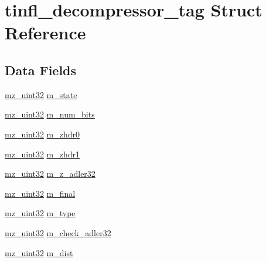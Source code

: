 \hypertarget{structtinfl__decompressor__tag}{}\section{tinfl\+\_\+decompressor\+\_\+tag Struct Reference}
\label{structtinfl__decompressor__tag}
\subsection*{Data Fields}
\begin{DoxyCompactItemize}
\item 
\mbox{\hyperlink{tinfl_8c_ab1a91818a39ac203d5d9f12a003e8557}{mz\+\_\+uint32}} \mbox{\hyperlink{structtinfl__decompressor__tag_a89e483db0cdc8fe1f6663ad068eec049}{m\+\_\+state}}
\item 
\mbox{\hyperlink{tinfl_8c_ab1a91818a39ac203d5d9f12a003e8557}{mz\+\_\+uint32}} \mbox{\hyperlink{structtinfl__decompressor__tag_a504bc14c88dc5ad5c0425812f6e4ec4c}{m\+\_\+num\+\_\+bits}}
\item 
\mbox{\hyperlink{tinfl_8c_ab1a91818a39ac203d5d9f12a003e8557}{mz\+\_\+uint32}} \mbox{\hyperlink{structtinfl__decompressor__tag_a79053ee3b4b44065d3528b07f83c1742}{m\+\_\+zhdr0}}
\item 
\mbox{\hyperlink{tinfl_8c_ab1a91818a39ac203d5d9f12a003e8557}{mz\+\_\+uint32}} \mbox{\hyperlink{structtinfl__decompressor__tag_aae1a31a75908924bbd96f1f50c2803c0}{m\+\_\+zhdr1}}
\item 
\mbox{\hyperlink{tinfl_8c_ab1a91818a39ac203d5d9f12a003e8557}{mz\+\_\+uint32}} \mbox{\hyperlink{structtinfl__decompressor__tag_a64c2f8bd81e440a3e789da4cbbc8d8fb}{m\+\_\+z\+\_\+adler32}}
\item 
\mbox{\hyperlink{tinfl_8c_ab1a91818a39ac203d5d9f12a003e8557}{mz\+\_\+uint32}} \mbox{\hyperlink{structtinfl__decompressor__tag_a815f2b230ad5809549e42f29c39d3308}{m\+\_\+final}}
\item 
\mbox{\hyperlink{tinfl_8c_ab1a91818a39ac203d5d9f12a003e8557}{mz\+\_\+uint32}} \mbox{\hyperlink{structtinfl__decompressor__tag_ada5c7f3627958c65b19f2791c802d43d}{m\+\_\+type}}
\item 
\mbox{\hyperlink{tinfl_8c_ab1a91818a39ac203d5d9f12a003e8557}{mz\+\_\+uint32}} \mbox{\hyperlink{structtinfl__decompressor__tag_af030438b24a053f3a2c9ecd0546239d6}{m\+\_\+check\+\_\+adler32}}
\item 
\mbox{\hyperlink{tinfl_8c_ab1a91818a39ac203d5d9f12a003e8557}{mz\+\_\+uint32}} \mbox{\hyperlink{structtinfl__decompressor__tag_aeb88d8d957926c1ef2855d3c5f7cce9b}{m\+\_\+dist}}

\end{DoxyCompactItemize}
